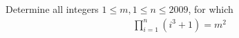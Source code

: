 Determine all integers $1 \le m, 1 \le n \le 2009$, for which
\begin{align*} \prod_{i=1}^n \left( i^3 +1 \right) = m^2 \end{align*}